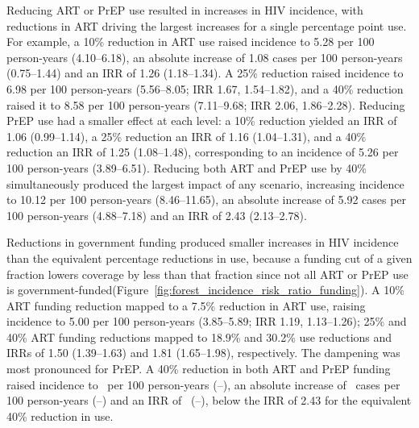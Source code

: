 \documentclass[preprint,12pt]{elsarticle}
\begin{document}
Reducing ART or PrEP use resulted in increases in HIV incidence, with reductions in ART driving the largest increases for a single percentage point use. For example, a 10\% reduction in ART use raised incidence to 5.28 per 100 person-years (4.10--6.18), an absolute increase of 1.08 cases per 100 person-years (0.75--1.44) and an IRR of 1.26 (1.18--1.34). A 25\% reduction raised incidence to 6.98 per 100 person-years (5.56--8.05; IRR 1.67, 1.54--1.82), and a 40\% reduction raised it to 8.58 per 100 person-years (7.11--9.68; IRR 2.06, 1.86--2.28). Reducing PrEP use had a smaller effect at each level: a 10\% reduction yielded an IRR of 1.06 (0.99--1.14), a 25\% reduction an IRR of 1.16 (1.04--1.31), and a 40\% reduction an IRR of 1.25 (1.08--1.48), corresponding to an incidence of 5.26 per 100 person-years (3.89--6.51). Reducing both ART and PrEP use by 40\% simultaneously produced the largest impact of any scenario, increasing incidence to 10.12 per 100 person-years (8.46--11.65), an absolute increase of 5.92 cases per 100 person-years (4.88--7.18) and an IRR of 2.43 (2.13--2.78).

Reductions in government funding produced smaller increases in HIV incidence than the equivalent percentage reductions in use, because a funding cut of a given fraction lowers coverage by less than that fraction since not all ART or PrEP use is government-funded(Figure~\ref{fig:forest_incidence_risk_ratio_funding}). A 10\% ART funding reduction mapped to a 7.5\% reduction in ART use, raising incidence to 5.00 per 100 person-years (3.85--5.89; IRR 1.19, 1.13--1.26); 25\% and 40\% ART funding reductions mapped to 18.9\% and 30.2\% use reductions and IRRs of 1.50 (1.39--1.63) and 1.81 (1.65--1.98), respectively. The dampening was most pronounced for PrEP. A 40\% reduction in both ART and PrEP funding raised incidence to \bothFortyIncidenceBaseline\ per 100 person-years (\bothFortyIncidenceBaselineLo--\bothFortyIncidenceBaselineHi), an absolute increase of \bothFortyAbsBaseline\ cases per 100 person-years (\bothFortyAbsBaselineLo--\bothFortyAbsBaselineHi) and an IRR of \bothFortyIRRBaseline\ (\bothFortyIRRBaselineLo--\bothFortyIRRBaselineHi), below the IRR of 2.43 for the equivalent 40\% reduction in use.
\end{document}
